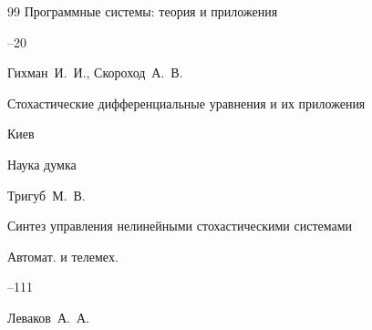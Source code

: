 \begin{thebibliography}{99}
\jour Программные системы: теория и приложения




--20







\by Гихман~И.~И., Скороход~А.~В.

\book  Стохастические дифференциальные уравнения и их приложения

\publaddr Киев

\publ Наука думка






\by Тригуб~М.~В.

\paper Синтез управления нелинейными стохастическими системами

\jour Автомат. и телемех.



--111


















\by Леваков~А.~А.


\end{thebibliography}
